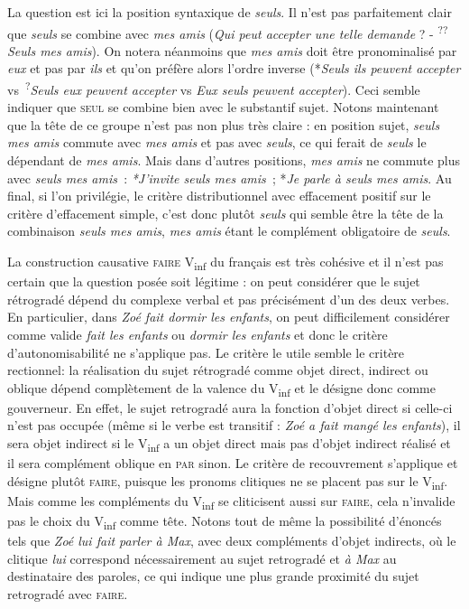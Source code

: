 {\begin{exe}
     La question est ici la position syntaxique de \textit{seuls}. Il n’est pas parfaitement clair que \textit{seuls} se combine avec \textit{mes amis} (\textit{Qui peut accepter une telle demande} ? - \textsuperscript{??}\textit{Seuls mes amis}). On notera néanmoins que \textit{mes amis} doit être pronominalisé par \textit{eux} et pas par \textit{ils} et qu’on préfère alors l’ordre inverse (*\textit{Seuls ils peuvent accepter} vs~\textsuperscript{?}\textit{Seuls eux peuvent accepter} vs \textit{Eux seuls peuvent accepter}). Ceci semble indiquer que \textsc{seul} se combine bien avec le substantif sujet. Notons maintenant que la tête de ce groupe n’est pas non plus très claire : en position sujet, \textit{seuls mes amis} commute avec \textit{mes amis} et pas avec \textit{seuls}, ce qui ferait de \textit{seuls} le dépendant de \textit{mes amis}. Mais dans d’autres positions, \textit{mes amis} ne commute plus avec \textit{seuls mes amis~}: \textit{*J’invite seuls mes amis~}; *\textit{Je parle à seuls mes amis}. Au final, si l’on privilégie, le critère distributionnel avec effacement positif sur le critère d’effacement simple, c’est donc plutôt \textit{seuls} qui semble être la tête de la combinaison \textit{seuls mes amis}, \textit{mes amis} étant le complément obligatoire de \textit{seuls}.
    \end{exe}

     La construction causative \textsc{faire} V\textsubscript{inf} du français est très cohésive et il n’est pas certain que la question posée soit légitime : on peut considérer que le sujet rétrogradé dépend du complexe verbal et pas précisément d’un des deux verbes. En particulier, dans \textit{Zoé fait dormir les enfants}, on peut difficilement considérer comme valide \textit{fait les enfants} ou \textit{dormir les enfants} et donc le critère d’autonomisabilité ne s’applique pas. Le critère le utile semble le critère rectionnel: la réalisation du sujet rétrogradé comme objet direct, indirect ou oblique dépend complètement de la valence du V\textsubscript{inf} et le désigne donc comme gouverneur. En effet, le sujet retrogradé aura la fonction d’objet direct si celle-ci n’est pas occupée (même si le verbe est transitif : \textit{Zoé a fait mangé les enfants}), il sera objet indirect si le V\textsubscript{inf} a un objet direct mais pas d’objet indirect réalisé et il sera complément oblique en \textsc{par} sinon. Le critère de recouvrement s’applique et désigne plutôt \textsc{faire}, puisque les pronoms clitiques ne se placent pas sur le V\textsubscript{inf}. Mais comme les compléments du V\textsubscript{inf} se cliticisent aussi sur \textsc{faire}, cela n’invalide pas le choix du V\textsubscript{inf} comme tête. Notons tout de même la possibilité d'énoncés tels que \textit{Zoé lui fait parler à Max}, avec deux compléments d'objet indirects, où
    le clitique \textit{lui} correspond nécessairement au sujet retrogradé et \textit{à Max} au destinataire des paroles, ce qui indique une plus grande proximité du sujet retrogradé avec \textsc{faire}.

}
